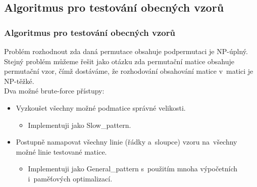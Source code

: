 \documentclass{beamer}
\begin{document}
\subsection{Algoritmus pro testování obecných vzorů}
\begin{frame}
\frametitle{Algoritmus pro testování obecných vzorů}
Problém rozhodnout zda daná permutace obsahuje podpermutaci je NP-úplný. Stejný problém můžeme řešit jako otázku zda permutační matice obsahuje permutační vzor, čímž dostáváme, že rozhodování obsahování matice v~matici je NP-těžké.\\
\pause
\vspace{1em}
Dva možné brute-force přístupy:
\pause
\vspace{1mm}
\begin{itemize}
\setlength\itemsep{3mm}
\item Vyzkoušet všechny možné podmatice správné velikosti.
\pause
\vspace{1mm}
\begin{itemize}
\item Implementuji jako Slow\_pattern.
\end{itemize}
\pause
\item Postupně namapovat všechny linie (řádky a~sloupce) vzoru na~všechny možné linie testované matice.
\begin{itemize}
\pause
\vspace{1mm}
\item Implementuji jako General\_pattern s~použitím mnoha výpočetních i~paměťových optimalizací.
\end{itemize}
\end{itemize}
\end{frame}
\end{document}
